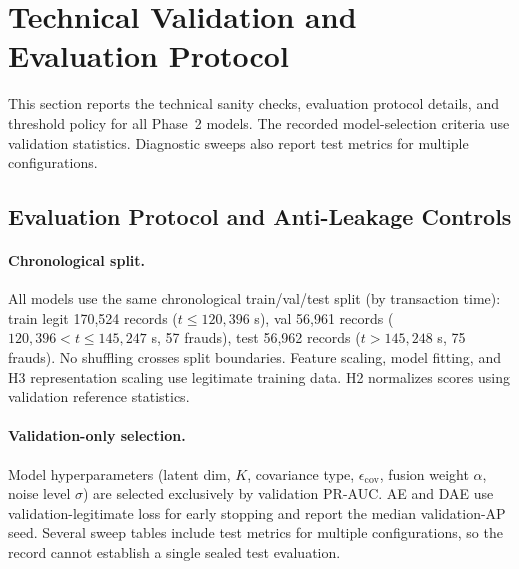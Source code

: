 
\section{Technical Validation and Evaluation Protocol}
\label{sec:p2_validation}

This section reports the technical sanity checks, evaluation protocol details, and threshold policy for all Phase~2 models. The recorded model-selection criteria use validation statistics. Diagnostic sweeps also report test metrics for multiple configurations.

\subsection{Evaluation Protocol and Anti-Leakage Controls}
\label{sec:p2_eval_protocol}

\paragraph{Chronological split.}
All models use the same chronological train/val/test split (by transaction time): train legit 170,524 records ($t \le 120{,}396$ s), val 56,961 records ($120{,}396 < t \le 145{,}247$ s, 57 frauds), test 56,962 records ($t > 145{,}248$ s, 75 frauds). No shuffling crosses split boundaries. Feature scaling, model fitting, and H3 representation scaling use legitimate training data. H2 normalizes scores using validation reference statistics.

\paragraph{Validation-only selection.}
Model hyperparameters (latent dim, $K$, covariance type, $\epsilon_{\text{cov}}$, fusion weight $\alpha$, noise level $\sigma$) are selected exclusively by validation PR-AUC. AE and DAE use validation-legitimate loss for early stopping and report the median validation-AP seed. Several sweep tables include test metrics for multiple configurations, so the record cannot establish a single sealed test evaluation.

